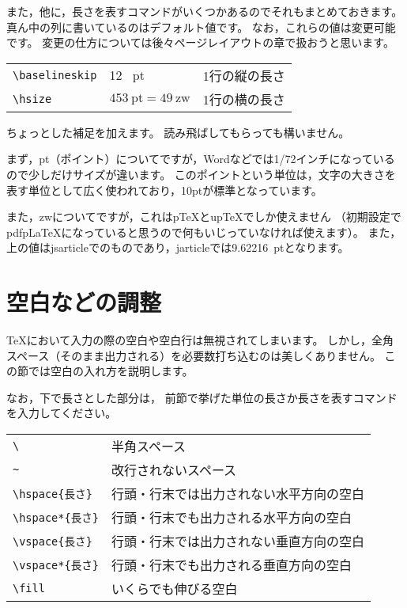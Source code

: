 また，他に，長さを表すコマンドがいくつかあるのでそれもまとめておきます。
真ん中の列に書いているのはデフォルト値です。
なお，これらの値は変更可能です。
変更の仕方については後々ページレイアウトの章で扱おうと思います。\\

\begin{center}
\begin{tabular}{lll}
\verb|\baselineskip| & 12 \ pt & 1行の縦の長さ \\
\verb|\hsize| & $\mathrm{453 \ pt = 49 \ zw}$ & 1行の横の長さ
\end{tabular}
\end{center}

ちょっとした補足を加えます。
読み飛ばしてもらっても構いません。

まず，pt（ポイント）についてですが，Wordなどでは1/72インチになっているので少しだけサイズが違います。
このポイントという単位は，文字の大きさを表す単位として広く使われており，10ptが標準となっています。

また，zwについてですが，これは{p\TeX}と{up\TeX}でしか使えません
（初期設定で{pdfp\LaTeX}になっていると思うので何もいじっていなければ使えます）。
また，上の値はjsarticleでのものであり，jarticleでは\SI{9.62216}{pt}となります。



\section{空白などの調整}
{\TeX}において入力の際の空白や空白行は無視されてしまいます。
しかし，全角スペース（そのまま出力される）を必要数打ち込むのは美しくありません。
この節では空白の入れ方を説明します。

なお，下で長さとした部分は，
前節で挙げた単位の長さか長さを表すコマンドを入力してください。\\

\begin{center}
\begin{tabular}{ll}
\verb*|\ | & 半角スペース \\
\verb|~| & 改行されないスペース \\
\verb|\hspace{長さ}| & 行頭・行末では出力されない水平方向の空白 \\
\verb|\hspace*{長さ}| & 行頭・行末でも出力される水平方向の空白 \\
\verb|\vspace{長さ}| & 行頭・行末では出力されない垂直方向の空白 \\
\verb|\vspace*{長さ}| & 行頭・行末でも出力される垂直方向の空白 \\
\verb|\fill| & いくらでも伸びる空白
\end{tabular}
\end{center}

